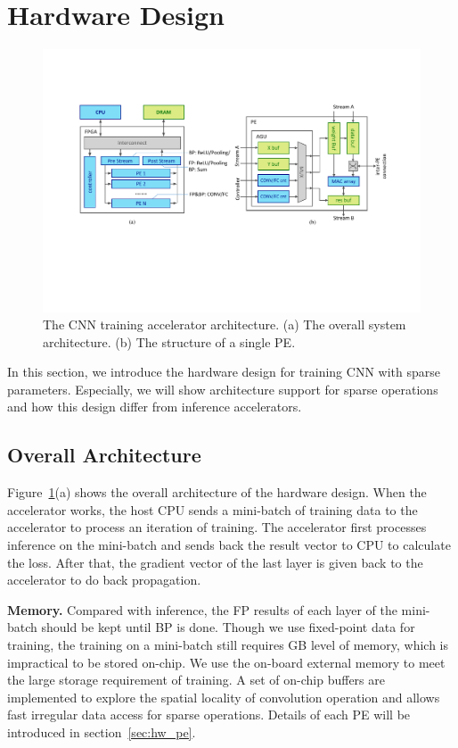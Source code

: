 \section{Hardware Design}\label{sec:hw}

\begin{figure}[htbp]
  \centering
  \includegraphics[width=1.8\columnwidth]{figures/hardware.pdf}
  \caption{The CNN training accelerator architecture. (a) The overall system architecture. (b) The structure of a single PE. }
  \label{fig:arch}
\end{figure}

In this section, we introduce the hardware design for training CNN with sparse parameters. Especially, we will show architecture support for sparse operations and how this design differ from inference accelerators.

\subsection{Overall Architecture}
Figure~\ref{fig:arch}(a) shows the overall architecture of the hardware design. When the accelerator works, the host CPU sends a mini-batch of training data to the accelerator to process an iteration of training. The accelerator first processes inference on the mini-batch and sends back the result vector to CPU to calculate the loss. After that, the gradient vector of the last layer is given back to the accelerator to do back propagation.

{\bf Memory.} Compared with inference, the FP results of each layer of the mini-batch should be kept until BP is done. Though we use fixed-point data for training, the training on a mini-batch still requires GB level of memory, which is impractical to be stored on-chip. We use the on-board external memory to meet the large storage requirement of training. A set of on-chip buffers are implemented to explore the spatial locality of convolution operation and allows fast irregular data access for sparse operations. Details of each PE will be introduced in section~\ref{sec:hw_pe}.

